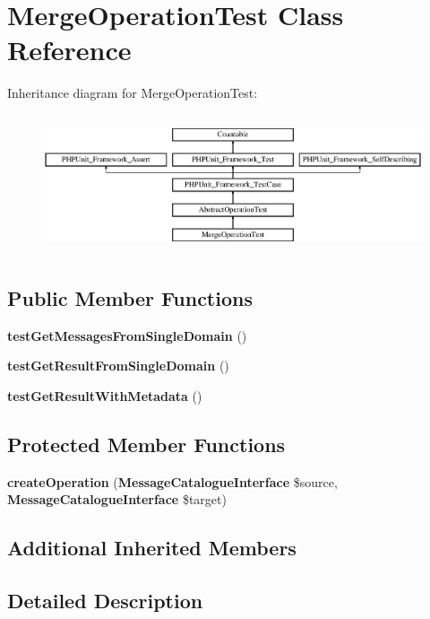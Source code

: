 \section{Merge\+Operation\+Test Class Reference}
\label{class_symfony_1_1_component_1_1_translation_1_1_tests_1_1_catalogue_1_1_merge_operation_test}
Inheritance diagram for Merge\+Operation\+Test\+:\begin{figure}[H]
\begin{center}
\leavevmode
\includegraphics[height=4.129793cm]{class_symfony_1_1_component_1_1_translation_1_1_tests_1_1_catalogue_1_1_merge_operation_test}
\end{center}
\end{figure}
\subsection*{Public Member Functions}
\begin{DoxyCompactItemize}
\item 
{\bf test\+Get\+Messages\+From\+Single\+Domain} ()
\item 
{\bf test\+Get\+Result\+From\+Single\+Domain} ()
\item 
{\bf test\+Get\+Result\+With\+Metadata} ()
\end{DoxyCompactItemize}
\subsection*{Protected Member Functions}
\begin{DoxyCompactItemize}
\item 
{\bf create\+Operation} ({\bf Message\+Catalogue\+Interface} \$source, {\bf Message\+Catalogue\+Interface} \$target)
\end{DoxyCompactItemize}
\subsection*{Additional Inherited Members}


\subsection{Detailed Description}



